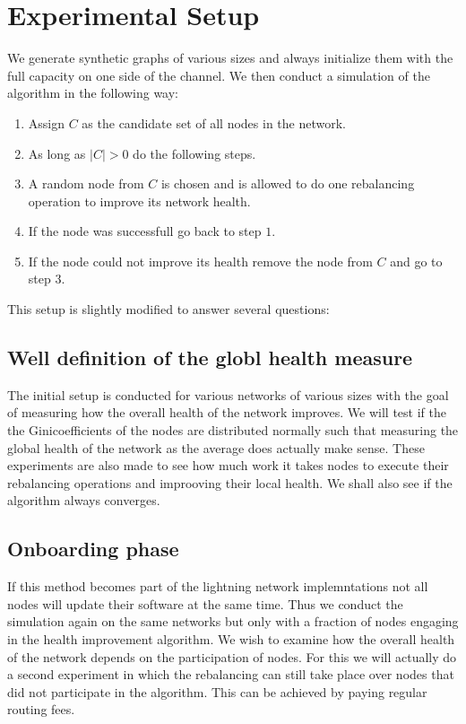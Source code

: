 \documentclass[a4paper]{paper}
\begin{document}
\section{Experimental Setup}
We generate synthetic graphs of various sizes and always initialize them with the full capacity on one side of the channel.
We then conduct a simulation of the algorithm in the following way:
\begin{enumerate}
\item Assign $C$ as the candidate set of all nodes in the network.
\item As long as $|C| > 0$ do the following steps.
\item A random node from $C$ is chosen and is allowed to do one rebalancing operation to improve its network health.
\item If the node was successfull go back to step $1$.
\item If the node could not improve its health remove the node from $C$ and go to step $3$.
\end{enumerate}

This setup is slightly modified to answer several questions:

\subsection{Well definition of the globl health measure}
The initial setup is conducted for various networks of various sizes with the goal of measuring how the overall health of the network improves.
We will test if the the Ginicoefficients of the nodes are distributed normally such that measuring the global health of the network as the average does actually make sense.
These experiments are also made to see how much work it takes nodes to execute their rebalancing operations and improoving their local health.
We shall also see if the algorithm always converges.

\subsection{Onboarding phase}
If this method becomes part of the lightning network implemntations not all nodes will update their software at the same time.
Thus we conduct the simulation again on the same networks but only with a fraction of nodes engaging in the health improvement algorithm.
We wish to examine how the overall health of the network depends on the participation of nodes.
For this we will actually do a second experiment in which the rebalancing can still take place over nodes that did not participate in the algorithm.
This can be achieved by paying regular routing fees.
\end{document}
